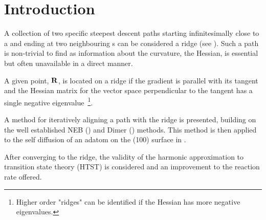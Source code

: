 \section{Introduction}
\label{sec:erm-introduction}
A collection of two specific steepest descent paths starting infinitesimally close to a  and ending at two neighbouring s can be considered a ridge (see ).
Such a path is non-trivial to find as information about the curvature, the Hessian, is essential but often unavailable in a direct manner.

A given point, ${\mathrm{\mathbf{\bm{R}}}}$, is located on a ridge if the gradient is parallel with its tangent and the Hessian matrix for the vector space perpendicular to the tangent has a single negative eigenvalue~\footnote{Higher order "ridges" can be identified if the Hessian has more negative eigenvalues.}.

A method for iteratively aligning a path with the ridge is presented, building on the well established NEB () and Dimer () methods.
This method is then applied to the self diffusion of an adatom on the (100) surface in .

After converging to the ridge, the validity of the harmonic approximation to transition state theory (HTST) is considered and an improvement to the reaction rate offered.
